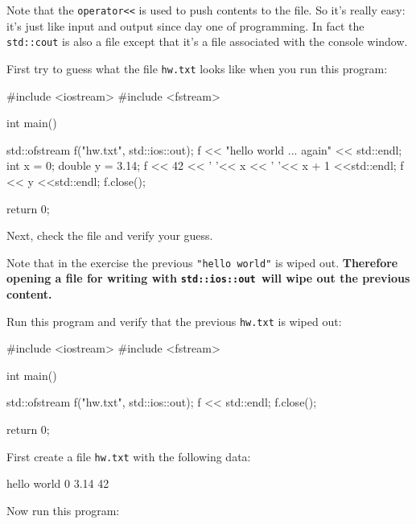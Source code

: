 Note that the \texttt{operator<<} is used to push contents to the file. So it's really easy: it's just like input and output since day one of programming. In fact the \texttt{std::cout} is also a file except that it's a file associated with the console window.

\begin{ex} First try to guess what the file \texttt{hw.txt} looks like when
you run this program:

\begin{console}
#include <iostream>
#include <fstream>

int main()
{   
    std::ofstream f("hw.txt", std::ios::out);
    f << "hello world ... again" << std::endl;
    int x = 0;
    double y = 3.14;
    f << 42 << ' '<< x << ' '<< x + 1 <<std::endl;
    f << y <<std::endl;
    f.close();

    return 0;
}
\end{console}

Next, check the file and verify your guess.
\end{ex}

Note that in the exercise the previous \texttt{"hello world"} is wiped out. \textbf{Therefore opening a file for writing with }\texttt{\textbf{std::ios::out }}\textbf{will wipe out the previous content.}

\begin{ex}
Run this program and verify that the previous \texttt{hw.txt} is wiped out:

\begin{console}
#include <iostream>
#include <fstream>

int main()
{   
    std::ofstream f("hw.txt", std::ios::out);
    f << std::endl;
    f.close();

    return 0;

}
\end{console}
\end{ex}

\newpage{}

First create a file \texttt{hw.txt} with the following data:

\begin{console}
hello world
0 3.14
42
\end{console}

Now run this program:

